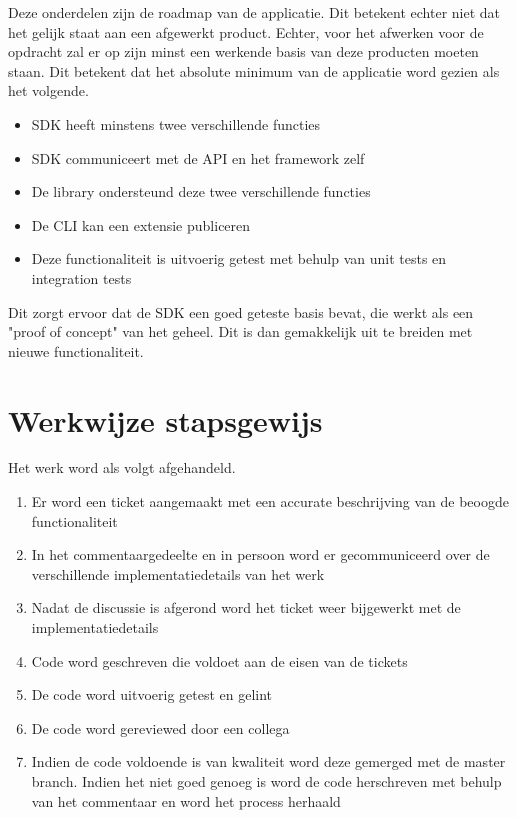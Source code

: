 Deze onderdelen zijn de roadmap van de applicatie. Dit betekent echter niet dat het gelijk staat aan een afgewerkt product. Echter, voor het afwerken voor de opdracht zal er op zijn minst een werkende basis van deze producten moeten staan. Dit betekent dat het absolute minimum van de applicatie word gezien als het volgende.

\begin{itemize}
	\item SDK heeft minstens twee verschillende functies
	\item SDK communiceert met de API en het framework zelf
	\item De library ondersteund deze twee verschillende functies
	\item De CLI kan een extensie publiceren
	\item Deze functionaliteit is uitvoerig getest met behulp van unit tests en integration tests	
\end{itemize}

Dit zorgt ervoor dat de SDK een goed geteste basis bevat, die werkt als een "proof of concept" van het geheel. Dit is dan gemakkelijk uit te breiden met nieuwe functionaliteit.

\section{Werkwijze stapsgewijs}

Het werk word als volgt afgehandeld.

\begin{enumerate}
	\item Er word een ticket aangemaakt met een accurate beschrijving van de beoogde functionaliteit
	\item In het commentaargedeelte en in persoon word er gecommuniceerd over de verschillende implementatiedetails van het werk
	\item Nadat de discussie is afgerond word het ticket weer bijgewerkt met de implementatiedetails
	\item Code word geschreven die voldoet aan de eisen van de tickets
	\item De code word uitvoerig getest en gelint
	\item De code word gereviewed door een collega
	\item Indien de code voldoende is van kwaliteit word deze gemerged met de master branch. Indien het niet goed genoeg is word de code herschreven met behulp van het commentaar en word het process herhaald
\end{enumerate}
